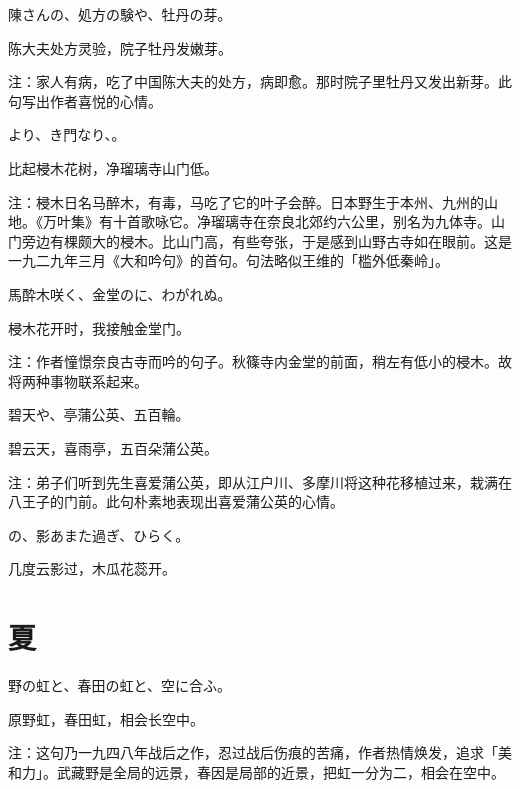 \begin{haiku}
    {\FH 陳さんの、処方の験や、牡丹の芽。}

    {\FK 陈大夫处方灵验，院子牡丹发嫩芽。}

    {\FT 注：家人有病，吃了中国陈大夫的处方，病即愈。那时院子里牡丹又发出新芽。此句写出作者喜悦的心情。}
\end{haiku}

\begin{haiku}
    {\FH {}より、き門なり、。}

    {\FK 比起梫木花树，净瑠璃寺山门低。}

    {\FT 注：梫木日名马醉木，有毒，马吃了它的叶子会醉。日本野生于本州、九州的山地。《万叶集》有十首歌咏它。净瑠璃寺在奈良北郊约六公里，别名为九体寺。山门旁边有棵颇大的梫木。比山门高，有些夸张，于是感到山野古寺如在眼前。这是一九二九年三月《大和吟句》的首句。句法略似王维的「槛外低秦岭」。}
\end{haiku}

\begin{haiku}
    {\FH 馬酔木咲く、金堂のに、わがれぬ。}

    {\FK 梫木花开时，我接触金堂门。}

    {\FT 注：作者憧憬奈良古寺而吟的句子。秋篠寺内金堂的前面，稍左有低小的梫木。故将两种事物联系起来。}
\end{haiku}

\begin{haiku}
    {\FH 碧天や、亭蒲公英、五百輪。}

    {\FK 碧云天，喜雨亭，五百朵蒲公英。}

    {\FT 注：弟子们听到先生喜爱蒲公英，即从江户川、多摩川将这种花移植过来，栽满在八王子的门前。此句朴素地表现出喜爱蒲公英的心情。}
\end{haiku}

\begin{haiku}
    {\FH {}の、影あまた過ぎ、ひらく。}

    {\FK 几度云影过，木瓜花蕊开。}
\end{haiku}

\section{\FK 夏}

\setcounter{haikucounter}{0}

\begin{haiku}
    {\FH 野の虹と、春田の虹と、空に合ふ。}

    {\FK 原野虹，春田虹，相会长空中。}

    {\FT 注：这句乃一九四八年战后之作，忍过战后伤痕的苦痛，作者热情焕发，追求「美和力」。武藏野是全局的远景，春因是局部的近景，把虹一分为二，相会在空中。}
\end{haiku}

